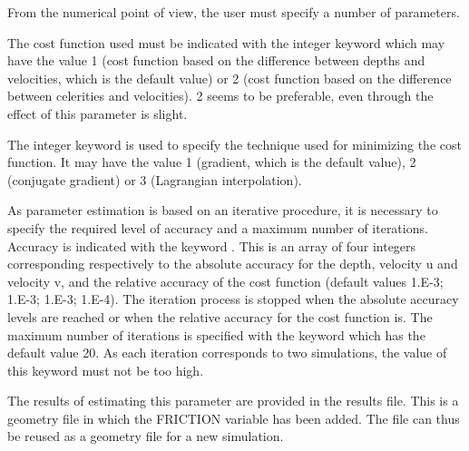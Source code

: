 From the numerical point of view, the user must specify a number of parameters.

 The cost function used must be indicated with the integer keyword  which may have the value 1 (cost function based on the difference between depths and velocities, which is the default value) or 2 (cost function based on the difference between celerities and velocities). 2 seems to be preferable, even through the effect of this parameter is slight.

 The integer keyword  is used to specify the technique used for minimizing the cost function. It may have the value 1 (gradient, which is the default value), 2 (conjugate gradient) or 3 (Lagrangian interpolation).

 As parameter estimation is based on an iterative procedure, it is necessary to specify the required level of accuracy and a maximum number of iterations. Accuracy is indicated with the keyword . This is an array of four integers corresponding respectively to the absolute accuracy for the depth, velocity u and velocity v, and the relative accuracy of the cost function (default values 1.E-3; 1.E-3; 1.E-3; 1.E-4). The iteration process is stopped when the absolute accuracy levels are reached or when the relative accuracy for the cost function is. The maximum number of iterations is specified with the keyword  which has the default value 20. As each iteration corresponds to two simulations, the value of this keyword must not be too high.

 The results of estimating this parameter are provided in the results file. This is a geometry file in which the FRICTION variable has been added. The file can thus be reused as a geometry file for a new simulation.


